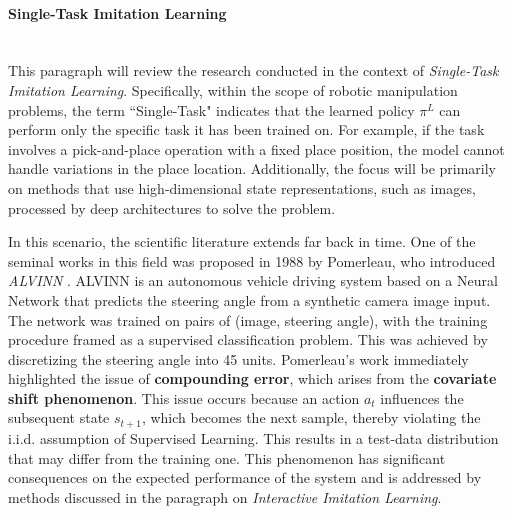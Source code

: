 \paragraph*{Single-Task Imitation Learning}\mbox{}\\
This paragraph will review the research conducted in the context of \textit{ Single-Task Imitation Learning}. Specifically, within the scope of robotic manipulation problems, the term ``Single-Task" indicates that the learned policy $\pi^{L}$ can perform only the specific task it has been trained on. For example, if the task involves a pick-and-place operation with a fixed place position, the model cannot handle variations in the place location. Additionally, the focus will be primarily on methods that use high-dimensional state representations, such as images, processed by deep architectures to solve the problem.

In this scenario, the scientific literature extends far back in time. One of the seminal works in this field was proposed in 1988 by Pomerleau, who introduced \textit{ALVINN} \cite{pomerleau1988alvinn}. ALVINN is an autonomous vehicle driving system based on a Neural Network that predicts the steering angle from a synthetic camera image input. The network was trained on pairs of (image, steering angle), with the training procedure framed as a supervised classification problem. This was achieved by discretizing the steering angle into 45 units. Pomerleau's work immediately highlighted the issue of \textbf{compounding error}, which arises from the \textbf{covariate shift phenomenon}. This issue occurs because an action $a_{t}$ influences the subsequent state $s_{t+1}$, which becomes the next sample, thereby violating the i.i.d. assumption of Supervised Learning. This results in a test-data distribution that may differ from the training one. This phenomenon has significant consequences on the expected performance of the system and is addressed by methods discussed in the paragraph on \textit{Interactive Imitation Learning}.

